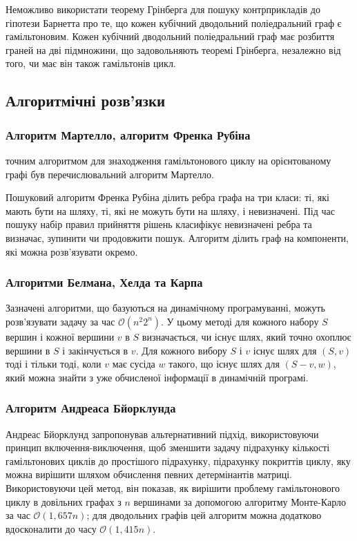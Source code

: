 \documentclass[14pt]{article}
\begin{document}
\begin{spacing}{1.175}
            Неможливо використати теорему Грінберга для пошуку контрприкладів до гіпотези Барнетта про те, що кожен кубічний дводольний поліедральний граф є гамільтоновим. Кожен кубічний дводольний поліедральний граф має розбиття граней на дві підмножини, що задовольняють теоремі Грінберга, незалежно від того, чи має він також гамільтонів цикл.
            
            \subsection{\normalfont Алгоритмічні розв'язки}
            \subsubsection{\normalfont Алгоритм Мартелло, алгоритм Френка Рубіна}
                
                 точним алгоритмом для знаходження гамільтонового циклу на орієнтованому графі був перечислювальний алгоритм Мартелло. 
            
                Пошуковий алгоритм Френка Рубіна ділить ребра графа на три класи: ті, які мають бути на шляху, ті, які не можуть бути на шляху, і невизначені. Під час пошуку набір правил прийняття рішень класифікує невизначені ребра та визначає, зупинити чи продовжити пошук. Алгоритм ділить граф на компоненти, які можна розв’язувати окремо.
            \subsubsection{\normalfont Алгоритми Белмана, Хелда та Карпа}

            \qquad Зазначені алгоритми, що базуються на динамічному програмуванні, можуть розв'язувати задачу за час \(\mathcal{O}(n^2 2^n)\). У цьому методі для кожного набору \(S\) вершин і кожної вершини \(v\) в \(S\) визначається, чи існує шлях, який точно охоплює вершини в \(S\) і закінчується в \(v\). Для кожного вибору \(S\) і \(v\) існує шлях для \((S, v)\) тоді і тільки тоді, коли \(v\) має сусіда \(w\) такого, що існує шлях для \((S - v, w)\), який можна знайти з уже обчисленої інформації в динамічній програмі.

            \subsubsection{\normalfont Алгоритм Андреаса Бйорклунда}
                \qquad Андреас Бйорклунд запропонував альтернативний підхід, використовуючи принцип включення-виключення, щоб зменшити задачу підрахунку кількості гамільтонових циклів до простішого підрахунку, підрахунку покриттів циклу, яку можна вирішити шляхом обчислення певних детермінантів матриці. Використовуючи цей метод, він показав, як вирішити проблему гамільтонового циклу в довільних графах з \(n\) вершинами за допомогою алгоритму Монте-Карло за час \(\mathcal{O}(1,657n)\); для дводольних графів цей алгоритм можна додатково вдосконалити до часу \(\mathcal{O}(1,415n)\).

\end{spacing}
\end{document}
